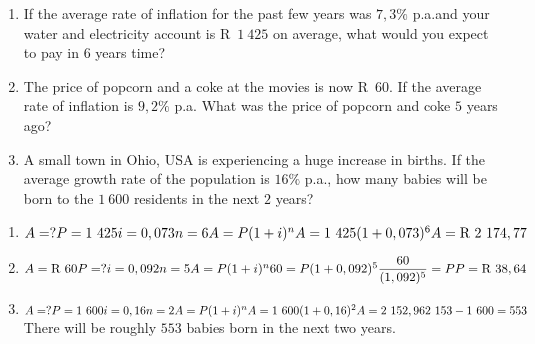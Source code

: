 \begin{exercises}{}{
    \begin{enumerate}[label=\textbf{\arabic*}.]
	\item If the average rate of inflation for the past few years was $7,3\%$ p.a.\@ and your water and electricity account is R~$1~425$ on average, what would you expect to pay in $6$ years time?
	\item The price of popcorn and a coke at the movies is now R~$60$. If the average rate of inflation is $9,2\%$ p.a. What was the price of popcorn and coke $5$ years ago?
	\item A small town in Ohio, USA is experiencing a huge increase in births. If the average growth rate of the population is $16\%$ p.a., how many babies will be born to the $1~600$ residents in the next $2$ years?\\
    \end{enumerate}
}
\end{exercises}


 \begin{solutions}{}{
\begin{enumerate}[itemsep=5pt, label=\textbf{\arabic*}. ] 


\item $A = ?\\
P=1~425\\
i=0,073\\
n=6\\
A=P(1 + i)^{n}\\
A = 1~425(1 + 0,073)^{6}\\
A = \mbox{R }2~174,77$
\item $A = \mbox{R }60\\
P=?\\
i=0,092\\
n=5\\
A=P(1 + i)^{n}\\
60 = P(1 + 0,092)^{5}\\
\dfrac{60}{(1,092)^5}=P\\
P = \mbox{R }38,64$
\item $A = ?\\
P=1~600\\
i=0,16\\
n=2\\
A=P(1 + i)^{n}\\
A = 1~600(1 + 0,16)^{2}\\
A = 2~152,96\\
2~153-1~600=553$\\
There will be roughly $553$ babies born in the next two years.
\end{enumerate}}
\end{solutions}


